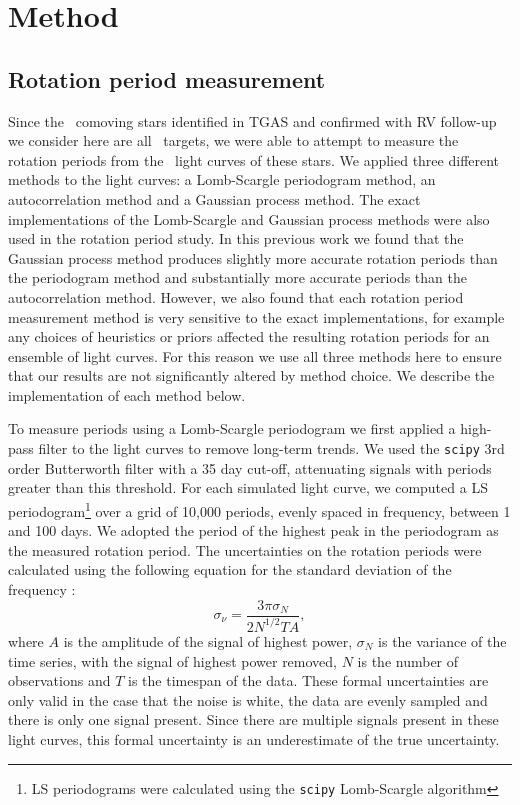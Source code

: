 \newcommand{\dantodo}[1]{{\color{blue}#1}}

\section{Method}
\label{sec:method}

\subsection{Rotation period measurement}

Since the \nconfirmed\ comoving stars identified in TGAS and confirmed with RV
follow-up we consider here are all \Kepler\ targets, we were able to attempt
to measure the rotation periods from the \kepler\ light curves of these stars.
We applied three different methods to the light curves: a Lomb-Scargle
periodogram method, an autocorrelation method and a Gaussian process method.
The exact implementations of the Lomb-Scargle and Gaussian process methods
were also used in the \citet{Angus2017} rotation period study.
In this previous work we found that the Gaussian process method produces
slightly more accurate rotation periods than the periodogram method and
substantially more accurate periods than the autocorrelation method.
However, we also found that each rotation period measurement method is very
sensitive to the exact implementations, for example any choices of heuristics
or priors affected the resulting rotation periods for an ensemble of light
curves.
For this reason we use all three methods here to ensure that our results are
not significantly altered by method choice.
We describe the implementation of each method below.

To measure periods using a Lomb-Scargle periodogram we first applied a
high-pass filter to the light curves to remove long-term trends.
We used the {\tt scipy} 3rd order Butterworth filter with a 35 day cut-off,
attenuating signals with periods greater than this threshold.
For each simulated light curve, we computed a LS periodogram\footnote{LS
periodograms were calculated using the {\tt scipy} Lomb-Scargle algorithm}
over a grid of 10,000 periods, evenly spaced in frequency, between 1 and 100
days.
We adopted the period of the highest peak in the periodogram as the measured
rotation period.
The uncertainties on the rotation periods were calculated using the
following equation for the standard deviation of the frequency
\citep{Horne1986, Kovacs1981}:
\begin{equation}
    \sigma_{\nu} = \frac{3\pi\sigma_N}{2N^{1/2}TA},
\end{equation}
where $A$ is the amplitude of the signal of highest power, $\sigma_N$ is the
variance of the time series, with the signal of highest power removed, $N$
is the number of observations and $T$ is the timespan of the data.
These formal uncertainties are only valid in the case that the noise is white,
the data are evenly sampled and there is only one signal present.
Since there are multiple signals present in these light curves, this formal
uncertainty is an underestimate of the true uncertainty.

